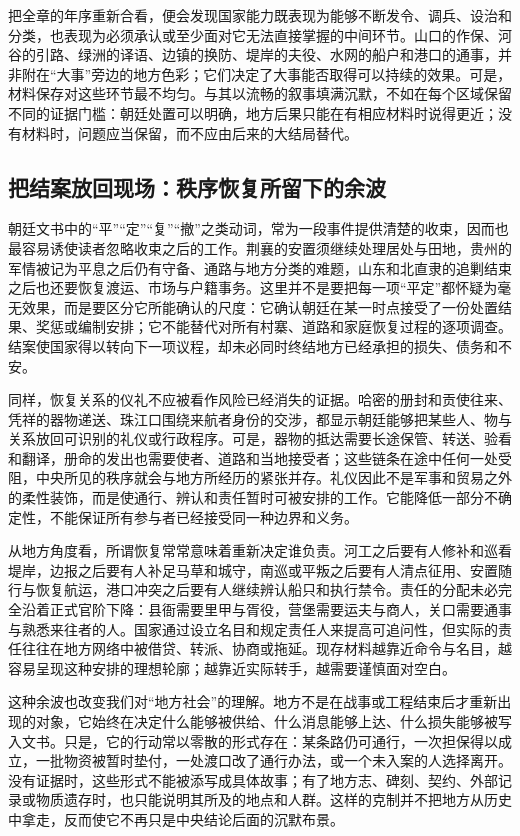 把全章的年序重新合看，便会发现国家能力既表现为能够不断发令、调兵、设治和分类，也表现为必须承认或至少面对它无法直接掌握的中间环节。山口的作保、河谷的引路、绿洲的译语、边镇的换防、堤岸的夫役、水网的船户和港口的通事，并非附在“大事”旁边的地方色彩；它们决定了大事能否取得可以持续的效果。可是，材料保存对这些环节最不均匀。与其以流畅的叙事填满沉默，不如在每个区域保留不同的证据门槛：朝廷处置可以明确，地方后果只能在有相应材料时说得更近；没有材料时，问题应当保留，而不应由后来的大结局替代。

\subsection{把结案放回现场：秩序恢复所留下的余波}

朝廷文书中的“平”“定”“复”“撤”之类动词，常为一段事件提供清楚的收束，因而也最容易诱使读者忽略收束之后的工作。荆襄的安置须继续处理居处与田地，贵州的军情被记为平息之后仍有守备、通路与地方分类的难题，山东和北直隶的追剿结束之后也还要恢复渡运、市场与户籍事务。这里并不是要把每一项“平定”都怀疑为毫无效果，而是要区分它所能确认的尺度：它确认朝廷在某一时点接受了一份处置结果、奖惩或编制安排；它不能替代对所有村寨、道路和家庭恢复过程的逐项调查。结案使国家得以转向下一项议程，却未必同时终结地方已经承担的损失、债务和不安。

同样，恢复关系的仪礼不应被看作风险已经消失的证据。哈密的册封和贡使往来、凭祥的器物递送、珠江口围绕来航者身份的交涉，都显示朝廷能够把某些人、物与关系放回可识别的礼仪或行政程序。可是，器物的抵达需要长途保管、转送、验看和翻译，册命的发出也需要使者、道路和当地接受者；这些链条在途中任何一处受阻，中央所见的秩序就会与地方所经历的紧张并存。礼仪因此不是军事和贸易之外的柔性装饰，而是使通行、辨认和责任暂时可被安排的工作。它能降低一部分不确定性，不能保证所有参与者已经接受同一种边界和义务。

从地方角度看，所谓恢复常常意味着重新决定谁负责。河工之后要有人修补和巡看堤岸，边报之后要有人补足马草和城守，南巡或平叛之后要有人清点征用、安置随行与恢复航运，港口冲突之后要有人继续辨认船只和执行禁令。责任的分配未必完全沿着正式官阶下降：县衙需要里甲与胥役，营堡需要运夫与商人，关口需要通事与熟悉来往者的人。国家通过设立名目和规定责任人来提高可追问性，但实际的责任往往在地方网络中被借贷、转派、协商或拖延。现存材料越靠近命令与名目，越容易呈现这种安排的理想轮廓；越靠近实际转手，越需要谨慎面对空白。

这种余波也改变我们对“地方社会”的理解。地方不是在战事或工程结束后才重新出现的对象，它始终在决定什么能够被供给、什么消息能够上达、什么损失能够被写入文书。只是，它的行动常以零散的形式存在：某条路仍可通行，一次担保得以成立，一批物资被暂时垫付，一处渡口改了通行办法，或一个未入案的人选择离开。没有证据时，这些形式不能被添写成具体故事；有了地方志、碑刻、契约、外部记录或物质遗存时，也只能说明其所及的地点和人群。这样的克制并不把地方从历史中拿走，反而使它不再只是中央结论后面的沉默布景。


